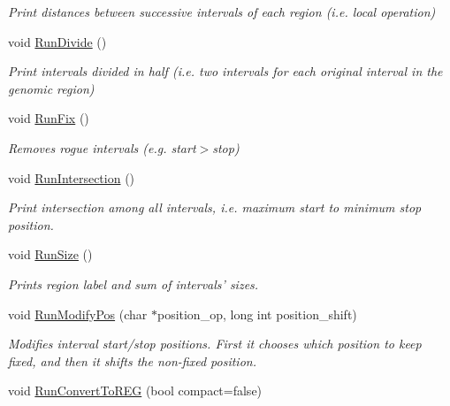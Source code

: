 \begin{DoxyCompactItemize}
\begin{DoxyCompactList}\small\item\em Print distances between successive intervals of each region (i.e. local operation) \end{DoxyCompactList}\item 
\hypertarget{classGenomicRegionSet_a9acb3424739ed62c0efddad01536ad18}{
void \hyperlink{classGenomicRegionSet_a9acb3424739ed62c0efddad01536ad18}{RunDivide} ()}
\label{classGenomicRegionSet_a9acb3424739ed62c0efddad01536ad18}

\begin{DoxyCompactList}\small\item\em Print intervals divided in half (i.e. two intervals for each original interval in the genomic region) \end{DoxyCompactList}\item 
\hypertarget{classGenomicRegionSet_aefa09dc62c768a06e4ca1f56fd683be5}{
void \hyperlink{classGenomicRegionSet_aefa09dc62c768a06e4ca1f56fd683be5}{RunFix} ()}
\label{classGenomicRegionSet_aefa09dc62c768a06e4ca1f56fd683be5}

\begin{DoxyCompactList}\small\item\em Removes rogue intervals (e.g. start$>$stop) \end{DoxyCompactList}\item 
\hypertarget{classGenomicRegionSet_ae598cd9c5f94555a04e43f9fe6334aec}{
void \hyperlink{classGenomicRegionSet_ae598cd9c5f94555a04e43f9fe6334aec}{RunIntersection} ()}
\label{classGenomicRegionSet_ae598cd9c5f94555a04e43f9fe6334aec}

\begin{DoxyCompactList}\small\item\em Print intersection among all intervals, i.e. maximum start to minimum stop position. \end{DoxyCompactList}\item 
\hypertarget{classGenomicRegionSet_ab1e96bd7781dac63a1745a8cf5ac5538}{
void \hyperlink{classGenomicRegionSet_ab1e96bd7781dac63a1745a8cf5ac5538}{RunSize} ()}
\label{classGenomicRegionSet_ab1e96bd7781dac63a1745a8cf5ac5538}

\begin{DoxyCompactList}\small\item\em Prints region label and sum of intervals' sizes. \end{DoxyCompactList}\item 
void \hyperlink{classGenomicRegionSet_a11f1e58c92e9b0b2e3feb5821cff1a55}{RunModifyPos} (char $\ast$position\_\-op, long int position\_\-shift)
\begin{DoxyCompactList}\small\item\em Modifies interval start/stop positions. First it chooses which position to keep fixed, and then it shifts the non-\/fixed position. \end{DoxyCompactList}\item 
\hypertarget{classGenomicRegionSet_a8f71dd5fa48a0878751cd78a3b485daf}{
void \hyperlink{classGenomicRegionSet_a8f71dd5fa48a0878751cd78a3b485daf}{RunConvertToREG} (bool compact=false)}
\label{classGenomicRegionSet_a8f71dd5fa48a0878751cd78a3b485daf}


\end{DoxyCompactItemize}
